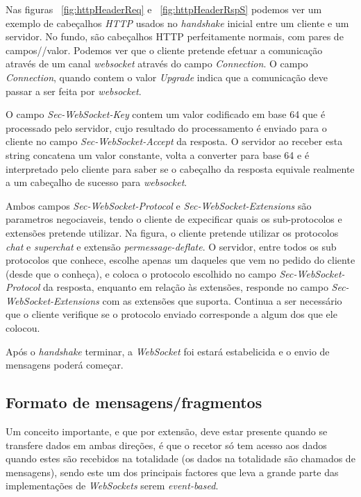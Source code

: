 \documentclass[a4paper]{article}
\begin{document}
Nas figuras ~\ref{fig:httpHeaderReq} e ~\ref{fig:httpHeaderRspS} podemos ver um exemplo de cabeçalhos \emph{HTTP} usados no \emph{handshake} inicial entre um cliente e um servidor. No fundo, são cabeçalhos HTTP perfeitamente normais, com pares de campos//valor. Podemos ver que o cliente pretende efetuar a comunicação através de um canal \emph{websocket} através do campo \emph{Connection}. O campo \emph{Connection}, quando contem o valor \emph{Upgrade} indica que a comunicação deve passar a ser feita por \emph{websocket}.

O campo \emph{Sec-WebSocket-Key} contem um valor codificado em base 64 que é processado pelo servidor, cujo resultado do processamento é enviado para o cliente no campo \emph{Sec-WebSocket-Accept} da resposta. O servidor ao receber esta string concatena um valor constante, volta a converter para base 64 e é interpretado pelo cliente para saber se o cabeçalho da resposta equivale realmente a um cabeçalho de sucesso para \emph{websocket}.

Ambos campos \emph{Sec-WebSocket-Protocol} e \emph{Sec-WebSocket-Extensions} são parametros negociaveis, tendo o cliente de expecificar quais os sub-protocolos e extensões pretende utilizar. Na figura, o cliente pretende utilizar os protocolos \emph{chat} e \emph{superchat} e extensão \emph{permessage-deflate}. O servidor, entre todos os sub protocolos que conhece, escolhe apenas um daqueles que vem no pedido do cliente (desde que o conheça), e coloca o protocolo escolhido no campo \emph{Sec-WebSocket-Protocol} da resposta, enquanto em relação às extensões, responde no campo \emph{Sec-WebSocket-Extensions} com as extensões que suporta. Continua a ser necessário que o cliente verifique se o protocolo enviado corresponde a algum dos que ele colocou.

Após o \emph{handshake} terminar, a \emph{WebSocket} foi estará estabelicida e o envio de mensagens poderá começar.

\subsection{Formato de mensagens/fragmentos}

Um conceito importante, e que por extensão, deve estar presente quando se transfere dados em ambas direções, é que o recetor só tem acesso aos dados quando estes são recebidos na totalidade (os dados na totalidade são chamados de mensagens), sendo este um dos principais factores que leva a grande parte das implementações de \emph{WebSockets} serem \emph{event-based}. 
\end{document}

